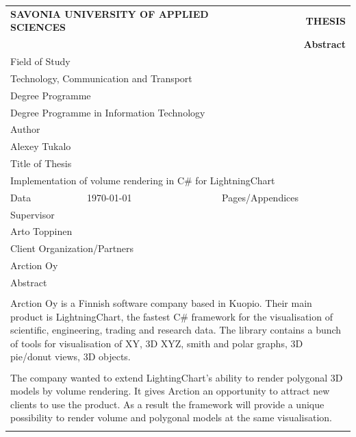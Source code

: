 \documentclass[twoside, english, 11pt]{report}
\begin{document}
\begin{table}[!h]
\begin{tabular}{| l | l | l | l |}
\multicolumn{2}{l}{\textbf{SAVONIA UNIVERSITY OF APPLIED SCIENCES}}&
\multicolumn{2}{r}{\textbf{THESIS}}\\
\multicolumn{4}{r}{\textbf{Abstract}}\\
\hline
\multicolumn{4}{|l|}{Field of Study}\\
\multicolumn{4}{|l|}{Technology, Communication and Transport}\\
\hline
\multicolumn{4}{|l|}{Degree Programme}\\
\multicolumn{4}{|l|}{Degree Programme in Information Technology}\\
\hline
\multicolumn{4}{|l|}{Author}\\
\multicolumn{4}{|l|}{Alexey Tukalo}\\
\hline
\multicolumn{4}{|l|}{Title of Thesis}\\
\multicolumn{4}{|l|}{Implementation of volume rendering in C\# for LightningChart}\\
\hline
Data & \today & Pages/Appendices & \pageref{LastPage}\\
\hline
\multicolumn{4}{|l|}{Supervisor}\\
\multicolumn{4}{|l|}{Arto Toppinen}\\
\hline
\multicolumn{4}{|l|}{Client Organization/Partners}\\
\multicolumn{4}{|l|}{Arction Oy}\\
\hline
\multicolumn{4}{|l|}{Abstract}\\
\multicolumn{4}{|l|}{ }\\
\multicolumn{4}{|p{14cm}|}{
Arction Oy is a Finnish software company based in Kuopio. Their main product is LightningChart, the fastest C\# framework for the visualisation of scientific, engineering, trading and research data. The library contains a bunch of tools for visualisation of XY, 3D XYZ, smith and polar graphs, 3D pie/donut views, 3D objects.
}\\
\multicolumn{4}{|l|}{ }\\
\multicolumn{4}{|p{14cm}|}{
The company wanted to extend LightingChart's ability to render polygonal 3D models by volume rendering. It gives Arction an opportunity to attract new clients to use the product. As a result the framework will provide a unique possibility to render volume and polygonal models at the same visualisation.
}\\
\multicolumn{4}{|l|}{ }\\

\end{tabular}
\end{table}
\end{document}
